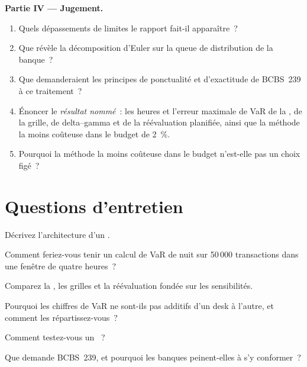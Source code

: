 \begin{problem}
\medskip\noindent\textbf{Partie IV --- Jugement.}
\begin{enumerate}[resume]
\item Quels dépassements de limites le rapport fait-il apparaître~?
\item Que révèle la décomposition d'Euler sur la queue de distribution de la banque~?
\item Que demanderaient les principes de ponctualité et d'exactitude de BCBS~239 à ce traitement~?
\item Énoncer le \emph{résultat nommé}~: les heures et l'erreur maximale de VaR de la , de la grille, de delta--gamma et de la
réévaluation planifiée, ainsi que la méthode la moins coûteuse dans le budget de 2~\%.
\item Pourquoi la méthode la moins coûteuse dans le budget n'est-elle pas un choix figé~?
\end{enumerate}
\end{problem}

\section{Questions d'entretien}

\begin{interviewq}\label{iq:rc:build-a-risk-engine:1}
Décrivez l'architecture d'un .
\end{interviewq}

\begin{interviewq}\label{iq:rc:build-a-risk-engine:2}
Comment feriez-vous tenir un calcul de VaR de nuit sur 50\,000 transactions dans une fenêtre de quatre heures~?
\end{interviewq}

\begin{interviewq}\label{iq:rc:build-a-risk-engine:3}
Comparez la , les grilles et la réévaluation fondée sur les sensibilités.
\end{interviewq}

\begin{interviewq}\label{iq:rc:build-a-risk-engine:4}
Pourquoi les chiffres de VaR ne sont-ils pas additifs d'un desk à l'autre, et comment les répartissez-vous~?
\end{interviewq}

\begin{interviewq}\label{iq:rc:build-a-risk-engine:5}
Comment testez-vous un ~?
\end{interviewq}

\begin{interviewq}\label{iq:rc:build-a-risk-engine:6}
Que demande BCBS~239, et pourquoi les banques peinent-elles à s'y conformer~?
\end{interviewq}
